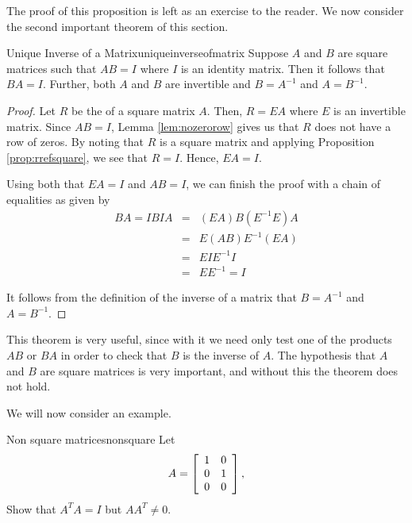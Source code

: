 The proof of this proposition is left as an exercise to the reader. 
We now consider the second important theorem of this section. 

\begin{theorem}{Unique Inverse of a Matrix}{uniqueinverseofmatrix}
Suppose $A$ and $B$ are square matrices such that $AB=I$ where $I$ is an identity matrix. Then it follows that $BA=I$. Further, both $A$ and $B$ are invertible and $B=A^{-1}$ and $A=B^{-1}$.
\end{theorem}

\begin{proof}
Let $R$ be the {\rref} of a square matrix $A$. Then, $R=EA$ where $E$ is an invertible matrix. Since $AB=I$, Lemma \ref{lem:nozerorow} gives us that $R$ does not have a row of zeros. By noting that $R$ is a square matrix and applying Proposition \ref{prop:rrefsquare}, we see that $R=I$. Hence, $EA=I$. 

Using both that $EA=I$ and $AB=I$, we can finish the proof with a chain of equalities as given by
\begin{eqnarray*}
BA = IBIA &=& (EA)B(E^{-1}E)A \\
&=& E(AB)E^{-1}(EA) \\
&=& EIE^{-1}I \\
&=& EE^{-1} = I
\end{eqnarray*}

It follows from the definition of the inverse of a matrix that $B=A^{-1}$ and $A=B^{-1}$.
\end{proof}

This theorem is very useful, since with it we need only test one of the products $AB$ or $BA$ in order to check that $B$ is the inverse of $A$. The hypothesis that $A$ and $B$ are square matrices is very important, and without this the theorem does not hold.

We will now consider an example.

\begin{example}{Non square matrices}{nonsquare}
Let 
\begin{equation*}
A =
\left[
\begin{array}{rr}
1 & 0 \\
0 & 1 \\
0 & 0 
\end{array}
\right],
\end{equation*}
Show that $A^{T}A = I$ but $AA^{T} \neq 0$. 
\end{example}

